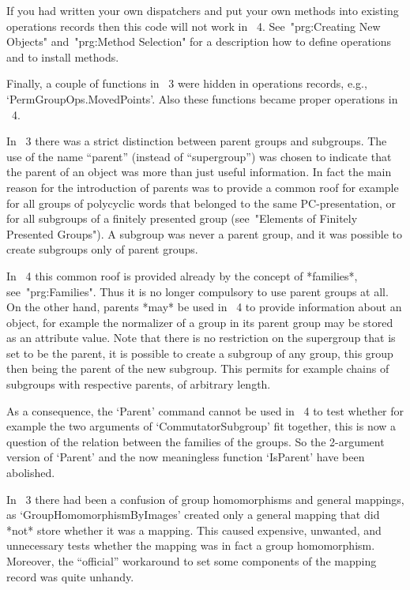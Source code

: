 If you had written your own dispatchers and put your own methods into
existing operations records then this code will not work in {\GAP}~4.
See~"prg:Creating New Objects" and~"prg:Method Selection"
for a description how to define operations and to install methods.

Finally, a couple of functions in {\GAP}~3 were hidden in
operations records, e.g., `PermGroupOps.MovedPoints'.
Also these functions became proper operations in {\GAP}~4.



In {\GAP}~3 there was a strict distinction between parent groups and
subgroups.
The use of the name ``parent'' (instead of ``supergroup'')
was chosen to indicate that the parent of an object was more than just
useful information.
In fact the main reason for the introduction of parents was to provide
a common roof for example for all groups of polycyclic words that
belonged to the same PC-presentation, or for all subgroups of a finitely
presented group (see~"Elements of Finitely Presented Groups").
A subgroup was never a parent group, and it was possible to create
subgroups only of parent groups.

In {\GAP}~4 this common roof is provided already by the concept of
*families*, see~"prg:Families".
Thus it is no longer compulsory to use parent groups at all.
On the other hand, parents *may* be used in {\GAP}~4 to provide
information about an object, for example the normalizer of a group in its
parent group may be stored as an attribute value.
Note that there is no restriction on the supergroup that is set to be
the parent,
it is possible to create a subgroup of
any group, this group then being the parent of the new subgroup.
This permits for example chains of subgroups with respective parents,
of arbitrary length.

As a consequence, the `Parent' command cannot be used in {\GAP}~4
to test whether for example the two arguments of `CommutatorSubgroup'
fit together, this is now a question of the relation between the families
of the groups.
So the 2-argument version of `Parent' and the now meaningless function
`IsParent' have been abolished.



In {\GAP}~3 there had been a confusion of group homomorphisms and general
mappings,
as `GroupHomomorphismByImages' created only a general mapping that did
*not* store whether it was a mapping.
This caused expensive, unwanted, and unnecessary tests whether the
mapping was in fact a group homomorphism.
Moreover, the ``official'' workaround to set some components of the
mapping record was quite unhandy.

